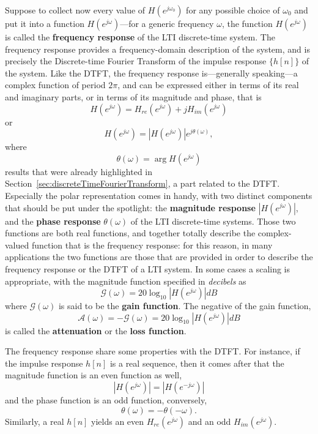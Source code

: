 \documentclass[\documentfontsize, twocolumn]{\classname}
\begin{document}
Suppose to collect now every value of $H(e^{j\omega_0})$ for any possible choice of $\omega_0$ and put it into a function $H(e^{j\omega})$---for a generic frequency $\omega$, the function $H(e^{j\omega})$ is called the \textbf{frequency response} of the LTI discrete-time system. The frequency response provides a frequency-domain description of the system, and is precisely the Discrete-time Fourier Transform of the impulse response $\{h[n]\}$ of the system. Like the DTFT, the frequency response is---generally speaking---a complex function of period $2\pi$, and can be expressed either in terms of its real and imaginary parts, or in terms of its magnitude and phase, that is
\[
    H(e^{j\omega}) = H_{re}(e^{j\omega}) + jH_{im}(e^{j\omega})
\]
or
\[
    H(e^{j\omega}) = \left|H(e^{j\omega})\right| e^{j\theta(\omega)},
\]
where
\[
    \theta(\omega) = \arg{H(e^{j\omega})}
\]
results that were already highlighted in Section~\ref{sec:discreteTimeFourierTransform}, a part related to the DTFT. Especially the polar representation comes in handy, with two distinct components that should be put under the spotlight: the \textbf{magnitude response} $\left|H(e^{j\omega})\right|$, and the \textbf{phase response} $\theta(\omega)$ of the LTI discrete-time systems. Those two functions are both real functions, and together totally describe the complex-valued function that is the frequency response: for this reason, in many applications the two functions are those that are provided in order to describe the frequency response or the DTFT of a LTI system. In some cases a scaling is appropriate, with the magnitude function specified in \emph{decibels} as
\[
    \mathcal G(\omega) = 20 \log_{10}{\left|H(e^{j\omega})\right|} dB
\]
where $\mathcal G(\omega)$ is said to be the \textbf{gain function}. The negative of the gain function,
\[
    \mathcal A(\omega) = -\mathcal G(\omega) = 20 \log_{10}{\left|H(e^{j\omega})\right|} dB
\]
is called the \textbf{attenuation} or the \textbf{loss function}.

The frequency response share some properties with the DTFT. For instance, if the impulse response $h[n]$ is a real sequence, then it comes after that the magnitude function is an even function as well,
\[
    \left|H(e^{j\omega})\right| = \left|H(e^{-j\omega})\right|
\]
and the phase function is an odd function, conversely,
\[
    \theta(\omega) = - \theta(-\omega).
\]
Similarly, a real $h[n]$ yields an even $H_{re}(e^{j\omega})$ and an odd $H_{im}(e^{j\omega})$.
\end{document}
